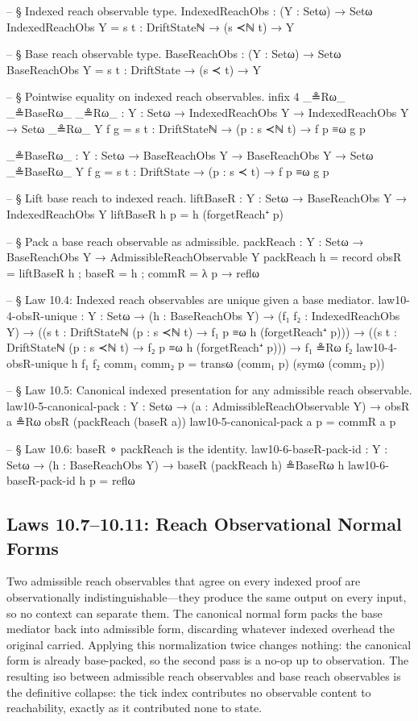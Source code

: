 \documentclass[11pt,a4paper]{book}
\begin{document}
\begin{code}
-- § Indexed reach observable type.
IndexedReachObs : (Y : Setω) → Setω
IndexedReachObs Y = {s t : DriftStateℕ} → (s ≺ℕ t) → Y

-- § Base reach observable type.
BaseReachObs : (Y : Setω) → Setω
BaseReachObs Y = {s t : DriftState} → (s ≺ t) → Y

-- § Pointwise equality on indexed reach observables.
infix 4 _≗Rω_ _≗BaseRω_
_≗Rω_ : {Y : Setω} → IndexedReachObs Y → IndexedReachObs Y → Setω
_≗Rω_ {Y} f g = {s t : DriftStateℕ} → (p : s ≺ℕ t) → f p ≡ω g p

_≗BaseRω_ : {Y : Setω} → BaseReachObs Y → BaseReachObs Y → Setω
_≗BaseRω_ {Y} f g = {s t : DriftState} → (p : s ≺ t) → f p ≡ω g p

-- § Lift base reach to indexed reach.
liftBaseR : {Y : Setω} → BaseReachObs Y → IndexedReachObs Y
liftBaseR h p = h (forgetReach⁺ p)

-- § Pack a base reach observable as admissible.
packReach : {Y : Setω} → BaseReachObs Y → AdmissibleReachObservable Y
packReach h = record
  { obsR  = liftBaseR h
  ; baseR = h
  ; commR = λ p → reflω
  }

-- § Law 10.4: Indexed reach observables are unique given a base mediator.
law10-4-obsR-unique :
  {Y : Setω} →
  (h : BaseReachObs Y) →
  (f₁ f₂ : IndexedReachObs Y) →
  (({s t : DriftStateℕ} (p : s ≺ℕ t) → f₁ p ≡ω h (forgetReach⁺ p))) →
  (({s t : DriftStateℕ} (p : s ≺ℕ t) → f₂ p ≡ω h (forgetReach⁺ p))) →
  f₁ ≗Rω f₂
law10-4-obsR-unique h f₁ f₂ comm₁ comm₂ p =
  transω (comm₁ p) (symω (comm₂ p))

-- § Law 10.5: Canonical indexed presentation for any admissible reach observable.
law10-5-canonical-pack :
  {Y : Setω} →
  (a : AdmissibleReachObservable Y) →
  obsR a ≗Rω obsR (packReach (baseR a))
law10-5-canonical-pack a p = commR a p

-- § Law 10.6: baseR ∘ packReach is the identity.
law10-6-baseR-pack-id :
  {Y : Setω} →
  (h : BaseReachObs Y) →
  baseR (packReach h) ≗BaseRω h
law10-6-baseR-pack-id h p = reflω
\end{code}

\subsection{Laws 10.7--10.11: Reach Observational Normal Forms}

Two admissible reach observables that agree on every indexed proof are observationally indistinguishable---they produce the same output on every input, so no context can separate them. The canonical normal form packs the base mediator back into admissible form, discarding whatever indexed overhead the original carried. Applying this normalization twice changes nothing: the canonical form is already base-packed, so the second pass is a no-op up to observation. The resulting iso between admissible reach observables and base reach observables is the definitive collapse: the tick index contributes no observable content to reachability, exactly as it contributed none to state.
\end{document}
